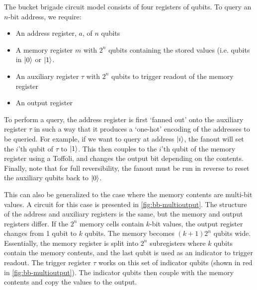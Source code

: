\documentclass[a4paper,12pt]{article}
\begin{document}
The bucket brigade circuit model consists of four registers of qubits. 
To query an $n$-bit address, we require:
\begin{itemize}
 \item An address register, $a$, of $n$ qubits
 \item A memory register $m$ with $2^n$ qubits containing the stored values (i.e. qubits in $\ket{0}$ or $\ket{1}$.
 \item An auxiliary register $\tau$ with $2^n$ qubits to trigger readout of the memory register
 \item An output register
\end{itemize}

To perform a query, the address register is first `fanned out' onto the auxiliary register $\tau$ in such a way that it produces a `one-hot' encoding of the addresses to be queried. 
For example, if we want to query at address $\ket{i}$, the fanout will set the $i$'th qubit of $\tau$ to $\ket{1}$. 
This then couples to the $i$'th qubit of the memory register using a Toffoli, and changes the output bit depending on the contents. 
Finally, note that for full reversibility, the fanout must be run in reverse to reset the auxiliary qubits back to $\ket{0}$. 

This can also be generalized to the case where the memory contents are multi-bit values. 
A circuit for this case is presented in \autoref{fig:bb-multioutput}. 
The structure of the address and auxiliary registers is the same, but the memory and output registers differ. 
If the $2^n$ memory cells contain $k$-bit values, the output register changes from 1 qubit to $k$ qubits.
The memory becomes $(k+1)2^n$ qubits wide. 
Essentially, the memory register is split into $2^n$ subregisters where $k$ qubits contain the memory contents, and the last qubit is used as an indicator to trigger readout. 
The trigger register $\tau$ works on this set of indicator qubits (shown in red in \autoref{fig:bb-multioutput}). 
The indicator qubits then couple with the memory contents and copy the values to the output.
\end{document}

